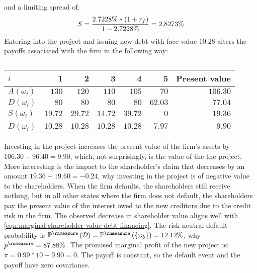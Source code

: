 \documentclass[main.tex]{subfiles}
\begin{document}
        and a limiting spread of:
        \begin{equation}
            S 
            = \frac{
                2.7228\% * (1 + r_{f})
            }{
                1 - 2.7228\%
            } 
            = 2.8273\%
        \end{equation}
        Entering into the project and issuing new debt with face value $10.28$ 
        alters the payoffs associated with the firm in the following way:
        \begin{table}[H]
            \centering
            \begin{tabular}{l|rrrrr||r}
                $i$ & 1 & 2 & 3 & 4 & 5 & Present value \\
                \hline
                $A(\omega_{i})$ & $130$ & $120$ & $110$ & $105$ & $70$ & $106.30$ \\
                $D(\omega_{i})$ & $80$ & $80$ & $80$ & $80$ & $62.03$ & $77.04$ \\
                $S(\omega_{i})$ & $19.72$ & $29.72$ & $14.72$ & $39.72$ & $0$ & $19.36$ \\
                $\tilde{D}(\omega_{i})$ & $10.28$ & $10.28$ & $10.28$ & $10.28$ & $7.97$ & $9.90$ \\
            \end{tabular}
            \caption{}
        \end{table}

        Investing in the project increases the present value of the firm's assets by $106.30 - 96.40 = 9.90$, 
        which, not surprisingly, is the value of the the project.
        More interesting is the impact to the shareholder's claim that decreases by an amount $19.36 - 19.60 = -0.24$, 
        why investing in the project is of negative value to the shareholders.
        When the firm defaults, the shareholders still receive nothing, 
        but in all other states where the firm does not default, 
        the shareholders pay the present value of the interest owed to the new creditors 
        due to the credit risk in the firm.
        The observed decrease in shareholder value aligns well with 
        \cref{eqn:marginal-shareholder-value-debt-financing}. 
        The risk neutral default probability is 
        $\mathbb{P}^{\rnmeasure}\left(\mathcal{D}\right) 
            = \mathbb{P}^{\rnmeasure}\left(\{\omega_{5}\}\right) 
            = 12.12\%$,
        why $p^{\rnmeasure} = 87.88\%$.
        The promised marginal profit of the new project is:
        $\pi = 0.99 * 10 - 9.90 = 0$.
        The payoff is constant, so the default event and the payoff have zero covariance. 
        
\end{document}
